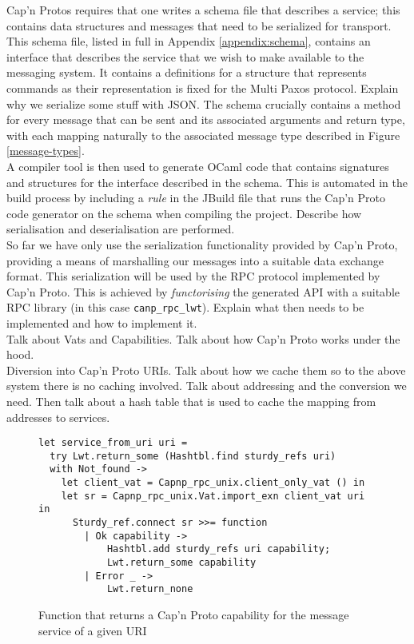 Cap'n Protos requires that one writes a schema file that describes a service; this contains data structures and messages that need to be serialized for transport. This schema file, listed in full in Appendix \ref{appendix:schema}, contains an interface that describes the service that we wish to make available to the messaging system. It contains a definitions for a structure that represents commands as their representation is fixed for the Multi Paxos protocol. {\color{red}Explain why we serialize some stuff with JSON}. The schema crucially contains a method for every message that can be sent and its associated arguments and return type, with each mapping naturally to the associated message type described in Figure \ref{message-types}. \\

A compiler tool is then used to generate OCaml code that contains signatures and structures for the interface described in the schema. This is automated in the build process by including a \emph{rule} in the JBuild file that runs the Cap'n Proto code generator on the schema when compiling the project. {\color{red}Describe how serialisation and deserialisation are performed}. \\

So far we have only use the serialization functionality provided by Cap'n Proto, providing a means of marshalling our messages into a suitable data exchange format. This serialization will be used by the RPC protocol implemented by Cap'n Proto. This is achieved by \emph{functorising} the generated API with a suitable RPC library (in this case \texttt{canp\_rpc\_lwt}). {\color{red}Explain what then needs to be implemented and how to implement it.} \\

{\color{red}Talk about Vats and Capabilities. Talk about how Cap'n Proto works under the hood.}\\

Diversion into Cap'n Proto URIs. Talk about how we cache them so to the above system there is no caching involved. Talk about addressing and the conversion we need. Then talk about a hash table that is used to cache the mapping from addresses to services. \\

\begin{figure}
  \begin{lstlisting}
let service_from_uri uri =
  try Lwt.return_some (Hashtbl.find sturdy_refs uri)
  with Not_found ->
    let client_vat = Capnp_rpc_unix.client_only_vat () in
    let sr = Capnp_rpc_unix.Vat.import_exn client_vat uri in
      Sturdy_ref.connect sr >>= function
        | Ok capability ->
            Hashtbl.add sturdy_refs uri capability;
            Lwt.return_some capability
        | Error _ -> 
            Lwt.return_none
  \end{lstlisting}
  \centering
  \caption{Function that returns a Cap'n Proto capability for the message service of a given URI}
  \label{fig:service-from-uri}
\end{figure}

